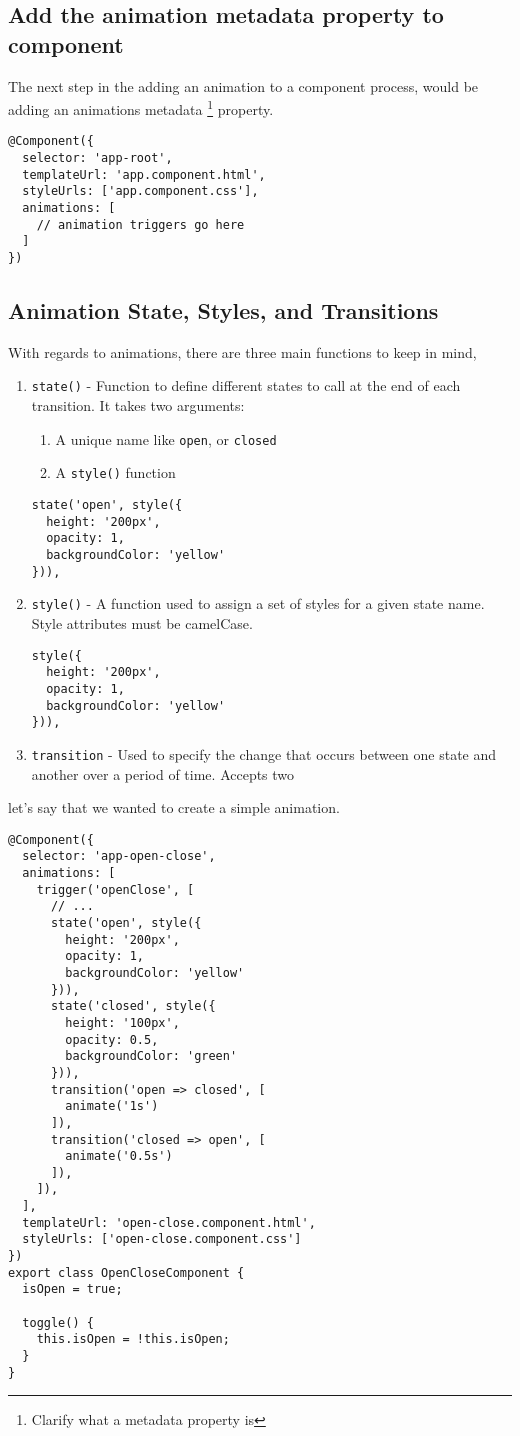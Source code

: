 \subsection{Add the animation metadata property to component}
The next step in the adding an animation to a component process, would be 
adding an animations metadata \footnote{Clarify what a metadata property is}
property.

\begin{lstlisting}
@Component({
  selector: 'app-root',
  templateUrl: 'app.component.html',
  styleUrls: ['app.component.css'],
  animations: [
    // animation triggers go here
  ]
})  
\end{lstlisting}

\subsection{ Animation State, Styles, and Transitions }
With regards to animations, there are three main functions to keep in mind, 
\begin{enumerate}
  \item \lstinline{state()} - Function to define different states to call at 
  the end of each transition. It takes two arguments: 
    \begin{enumerate}
      \item A unique name like \lstinline{open}, or \lstinline{closed}
      \item A \lstinline{style()} function 
    \end{enumerate}
    \begin{lstlisting}  
state('open', style({
  height: '200px',
  opacity: 1,
  backgroundColor: 'yellow'
})),
    \end{lstlisting}  
  \item \lstinline{style()} - A function used to assign a set of styles for 
  a given state name. Style attributes must be camelCase.
    \begin{lstlisting}
style({
  height: '200px',
  opacity: 1,
  backgroundColor: 'yellow'
})),
    \end{lstlisting}
  \item \lstinline{transition} - Used to specify the change that occurs 
  between one state and another over a period of time. Accepts two 
\end{enumerate}

let's say that we wanted to create a simple animation. 

\begin{lstlisting}
@Component({
  selector: 'app-open-close',
  animations: [
    trigger('openClose', [
      // ...
      state('open', style({
        height: '200px',
        opacity: 1,
        backgroundColor: 'yellow'
      })),
      state('closed', style({
        height: '100px',
        opacity: 0.5,
        backgroundColor: 'green'
      })),
      transition('open => closed', [
        animate('1s')
      ]),
      transition('closed => open', [
        animate('0.5s')
      ]),
    ]),
  ],
  templateUrl: 'open-close.component.html',
  styleUrls: ['open-close.component.css']
})
export class OpenCloseComponent {
  isOpen = true;

  toggle() {
    this.isOpen = !this.isOpen;
  }
}
\end{lstlisting}